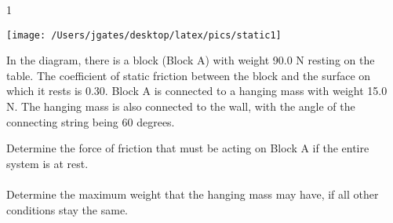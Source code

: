 
\AddToShipoutPicture*{\BackgroundPic}

\addtocounter {ProbNum} {1}

\begin{floatingfigure}[r]{.45\textwidth}
\texttt{[image: /Users/jgates/desktop/latex/pics/static1]}
\end{floatingfigure}
 
{\bf \Large{}} In the diagram, there is a block (Block A) with weight 90.0 N resting on the table. The coefficient of static friction between the block and the surface on which it rests is 0.30. Block A is connected to a hanging mass with weight 15.0 N. The hanging mass is also connected to the wall, with the angle of the connecting string being 60 degrees.

\bigskip
Determine the force of friction that must be acting on Block A if the entire system is at rest.
\paragraph{}
\noindent
\vfill
Determine the maximum weight that the hanging mass may have, if all other conditions stay the same.



\vfill
\newpage
